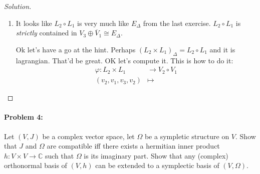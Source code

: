 \begin{proof}[Solution]
\begin{enumerate}[label=\alph*.]
	\item It looks like $L_2\circ L_1$ is very much like $E_\Delta$ from the last exercise. $L_2\circ L_1$ is \textit{strictly}  contained in $V_3\oplus \overline{V}_1\cong E_\Delta$.

		Ok let's have a go at the hint. Perhaps  $(L_2\times L_1)_\Delta= L_2\circ L_1$ and it is lagrangian. That'd be great. OK let's compute it. This is how to do it:
\begin{align*}
	\varphi: L_2\times L_1 &\longrightarrow V_2\circ V_1 \\
	(v_2,v_1,v_3,v_2) &\longmapsto 
\end{align*}



	
\end{enumerate}
\end{proof}

\paragraph{Problem 4:} Let $(V,J)$ be a complex vector space, let $\Omega$ be a sympletic structure on $V$. Show that $J$ and $\Omega$ are compatible iff there exists a hermitian inner product $h:V\times V\to \mathbb{C}$ such that $\Omega$ is its imaginary part. Show that any (complex) orthonormal basis of  $(V,h)$ can be extended to a symplectic basis of $(V,\Omega)$.

